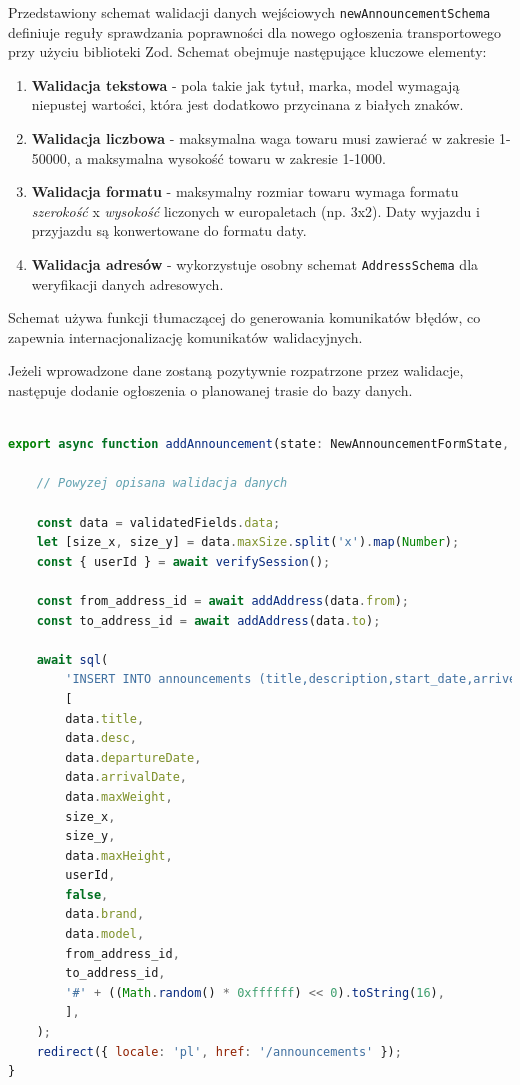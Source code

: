 Przedstawiony schemat walidacji danych wejściowych \texttt{newAnnouncementSchema} definiuje reguły sprawdzania poprawności dla nowego ogłoszenia transportowego przy użyciu biblioteki Zod. Schemat obejmuje następujące kluczowe elementy:
\begin{enumerate}
    \item \textbf{Walidacja tekstowa} - pola takie jak tytuł, marka, model wymagają niepustej wartości, która jest dodatkowo przycinana z białych znaków.
    \item \textbf{Walidacja liczbowa} - maksymalna waga towaru musi zawierać w zakresie 1-50000, a maksymalna wysokość towaru w zakresie 1-1000.
    \item \textbf{Walidacja formatu} - maksymalny rozmiar towaru wymaga formatu \emph{szerokość} x \emph{wysokość} liczonych w europaletach (np. 3x2). Daty wyjazdu i przyjazdu są konwertowane do formatu daty.
    \item \textbf{Walidacja adresów} - wykorzystuje osobny schemat \texttt{AddressSchema} dla weryfikacji danych adresowych.
\end{enumerate}
Schemat używa funkcji tłumaczącej do generowania komunikatów błędów, co zapewnia internacjonalizację komunikatów walidacyjnych.

Jeżeli wprowadzone dane zostaną pozytywnie rozpatrzone przez walidacje, następuje dodanie ogłoszenia o planowanej trasie do bazy danych.

{\belowcaptionskip=-9pt
\begin{lstlisting}[language=JavaScript,caption=Implementacja dodawania ogłoszenia do bazy danych, label=lst:addAnnouncementToDB]

export async function addAnnouncement(state: NewAnnouncementFormState, formData: FormData) {

    // Powyzej opisana walidacja danych

    const data = validatedFields.data;
    let [size_x, size_y] = data.maxSize.split('x').map(Number);
    const { userId } = await verifySession();

    const from_address_id = await addAddress(data.from);
    const to_address_id = await addAddress(data.to);

    await sql(
        'INSERT INTO announcements (title,description,start_date,arrive_date,max_weight,size_x,size_y,max_height,author_id,is_accepted,vehicle_brand,vehicle_model,from_address_id,to_address_id,road_color)VALUES($1,$2,$3,$4,$5,$6,$7,$8,$9,$10,$11,$12,$13,$14,$15)',
        [
        data.title,
        data.desc,
        data.departureDate,
        data.arrivalDate,
        data.maxWeight,
        size_x,
        size_y,
        data.maxHeight,
        userId,
        false,
        data.brand,
        data.model,
        from_address_id,
        to_address_id,
        '#' + ((Math.random() * 0xffffff) << 0).toString(16),
        ],
    );
    redirect({ locale: 'pl', href: '/announcements' });
}
\end{lstlisting}
}

